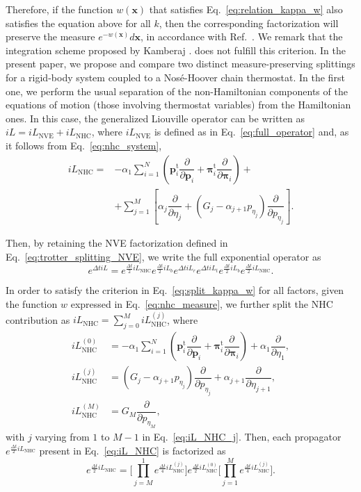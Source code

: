 \documentclass[aip,jcp,reprint,amsmath,amssymb]{revtex4-1}
\newcommand{\vt}[1]{\boldsymbol{\mathbf{#1}}}           %
\newcommand{\tr}[1]{#1^\text{t}}                        %
\newcommand{\diff}[2]{\dfrac{\partial #1}{\partial #2}} %
\begin{document}
Therefore, if the function $w(\vt x)$ that satisfies Eq.~\ref{eq:relation_kappa_w} also satisfies the equation above for all $k$, then the corresponding factorization will preserve the measure $e^{-w(\vt x)}d\vt x$, in accordance with Ref.~. We remark that the integration scheme proposed by Kamberaj .\cite{Kamberaj2005} does not fulfill this criterion. In the present paper, we propose and compare two distinct measure-preserving splittings for a rigid-body system coupled to a Nos\'e-Hoover chain thermostat. In the first one, we perform the usual separation of the non-Hamiltonian components of the equations of motion (those involving thermostat variables) from the Hamiltonian ones. In this case, the generalized Liouville operator can be written as $i\!L = i\!L_\text{NVE} + i\!L_\text{NHC}$, where $i\!L_\text{NVE}$ is defined as in Eq.~\ref{eq:full_operator} and, as it follows from Eq.~\ref{eq:nhc_system},
\begin{equation}
\label{eq:iL_NHC}
\begin{split}
i\!L_\text{NHC} = &-\alpha_1 \sum_{i=1}^N \left( \tr{\vt p}_i \diff{}{\vt p_i} + \tr{\vt \pi}_i \diff{}{\vt \pi_i}\right) + \\
&+ \sum_{j=1}^{M} \left[\alpha_j \diff{}{\eta_j} + (G_j - \alpha_{j+1} p_{\eta_j}) \diff{}{p_{\eta_j}}\right].
\end{split}
\end{equation}

Then, by retaining the NVE factorization defined in Eq.~\ref{eq:trotter_splitting_NVE}, we write the full exponential operator as
\begin{equation}
\label{eq:trotter_splitting_NHC}
e^{\Delta t i\!L} = e^{\frac{\Delta t}{2} i\!L_\text{NHC}} e^{\frac{\Delta t}{2} i\!L_b} e^{\Delta t i\!L_r} e^{\Delta t i\!L_t}  e^{\frac{\Delta t}{2} i\!L_b} e^{\frac{\Delta t}{2} i\!L_\text{NHC}}.
\end{equation}

In order to satisfy the criterion in Eq.~\ref{eq:split_kappa_w} for all factors, given the function $w$ expressed in Eq.~\ref{eq:nhc_measure}, we further split the NHC contribution as $i\!L_\text{NHC} = \sum_{j=0}^M i\!L_\text{NHC}^{(j)}$, where
\begin{subequations}
\begin{align}
i\!L_\text{NHC}^{(0)} &= -\alpha_1 \sum_{i=1}^N \left( \tr{\vt p}_i \diff{}{\vt p_i} + \tr{\vt \pi}_i \diff{}{\vt \pi_i}\right) + \alpha_1 \diff{}{\eta_1}, \\
i\!L_\text{NHC}^{(j)} &= (G_j - \alpha_{j+1} p_{\eta_j}) \diff{}{p_{\eta_j}} + \alpha_{j+1} \diff{}{\eta_{j+1}}, \label{eq:iL_NHC_j} \\
i\!L_\text{NHC}^{(M)} &= G_M \diff{}{p_{\eta_M}},
\end{align}
\end{subequations}
with $j$ varying from $1$ to $M-1$ in Eq.~\ref{eq:iL_NHC_j}. Then, each propagator $e^{\frac{\Delta t}{2} i\!L_\text{NHC}}$ present in Eq.~\ref{eq:iL_NHC} is factorized as
\[
e^{\frac{\Delta t}{2} i\!L_\text{NHC}} = \Bigg[ \prod_{j=M}^1 e^{\frac{\Delta t}{4} i\!L_\text{NHC}^{(j)} } \Bigg] e^{\frac{\Delta t}{2} i\!L_\text{NHC}^{(0)} } \Bigg[ \prod_{j=1}^M e^{\frac{\Delta t}{4} i\!L_\text{NHC}^{(j)} } \Bigg].
\]
\end{document}
